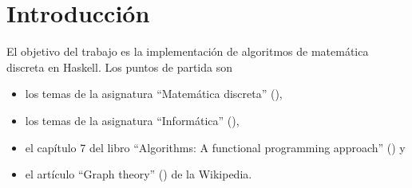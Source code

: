 \chapter*{Introducción}

El objetivo del trabajo es la implementación de algoritmos de matemática
discreta en Haskell. Los puntos de partida son 
\begin{itemize}
  \item los temas de la asignatura ``Matemática discreta'' (\cite{Cardenas-15a}),
  \item los temas de la asignatura ``Informática'' (\cite{Alonso-15a}),
  \item el capítulo 7 del libro ``Algorithms: A functional programming
    approach'' (\cite{Rabhi+Lapalme-99}) y
  \item el artículo ``Graph theory'' (\cite{Wikipedia-grafos}) de la Wikipedia.  
\end{itemize}
 
